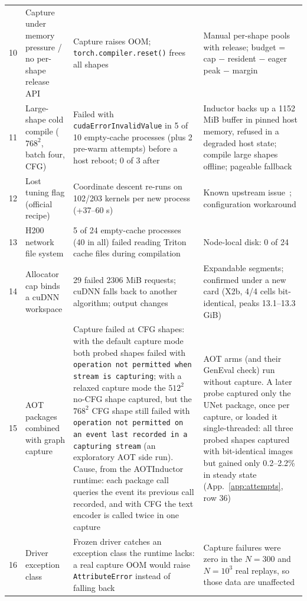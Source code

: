 \documentclass[conference]{IEEEtran}
\newcommand{\tn}[1]{#1}%
\begin{document}
\begin{table}[t]
\begin{tabularx}{\textwidth}{@{}rP{3.2cm}YY@{}}
10 & Capture under memory pressure / no per-shape release API & Capture raises OOM; \texttt{torch.compiler.reset()} frees all shapes & Manual per-shape pools with release; budget = cap $-$ resident $-$ eager peak $-$ margin\\
11 & Large-shape cold compile ($768^2$, batch four, CFG) & Failed with \texttt{cudaErrorInvalidValue} in 5 of 10 empty-cache processes (plus 2 pre-warm attempts) before a host reboot; 0 of 3 after & Inductor backs up a \tn{1152 MiB} buffer in pinned host memory, refused in a degraded host state; compile large shapes offline; pageable fallback\\
12 & Lost tuning flag (official recipe) & Coordinate descent re-runs on \tn{102/203} kernels per new process (+\tn{37--60 s}) & Known upstream issue~\cite{pt_issue}; configuration workaround\\
13 & H200 network file system & \tn{5 of 24} empty-cache processes (40 in all) failed reading Triton cache files during compilation & Node-local disk: \tn{0 of 24}\\
14 & Allocator cap binds a cuDNN workspace & \tn{29} failed \tn{2306 MiB} requests; cuDNN falls back to another algorithm; output changes & Expandable segments; confirmed under a new card (X2b, 4/4 cells bit-identical, peaks \tn{13.1--13.3 GiB})\\
15 & AOT packages combined with graph capture & Capture failed at CFG shapes: with the default capture mode both probed shapes failed with \texttt{operation not permitted when stream is capturing}; with a relaxed capture mode the $512^2$ no-CFG shape captured, but the $768^2$ CFG shape still failed with \texttt{operation not permitted on an event last recorded in a capturing stream} (an exploratory AOT side run). Cause, from the AOTInductor runtime: each package call queries the event its previous call recorded, and with CFG the text encoder is called twice in one capture & AOT arms (and their GenEval check) run without capture. A later probe captured only the UNet package, once per capture, or loaded it single-threaded: all three probed shapes captured with bit-identical images but gained only \tn{0.2--2.2\%} in steady state (App.~\ref{app:attempts}, row 36)\\
16 & Driver exception class & Frozen driver catches an exception class the runtime lacks: a real capture OOM would raise \texttt{AttributeError} instead of falling back & Capture failures were zero in the $N{=}300$ and $N{=}10^3$ real replays, so those data are unaffected\\
\bottomrule
\end{tabularx}
\end{table}
\end{document}
